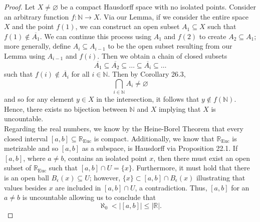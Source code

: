 \documentclass[ 12pt ]{article}
\begin{document}
\begin{enumerate}
		\begin{proof}
			Let $X \neq \varnothing$ be a compact Hausdorff space with no isolated points. Consider an arbitrary function $f : \mathbb{N} \to X$. Via our Lemma, if we consider
			the entire space $X$ and the point $f(1)$, we can construct an open subset $A_1 \subseteq X$ such that $f(1) \notin \overline{A_1}$. We can continue this process using $A_1$
			and $f(2)$ to create $A_2 \subseteq A_1$; more generally, define $A_i \subseteq A_{i-1}$ to be the open subset resulting from our Lemma using $A_{i-1}$ and $f(i)$. Then we
			obtain a chain of closed subsets $$\overline{A_1} \subseteq \overline{A_2} \subseteq \hdots \subseteq \overline{A_i} \subseteq \hdots$$ such that $f(i) \notin \overline{A_i}$
			for all $i \in \mathbb{N}$. Then by Corollary 26.3, $$\bigcap_{i \in \mathbb{N}} A_i \neq \varnothing$$ and so for any element $y \in X$ in the intersection, it follows that
			$y \notin f(\mathbb{N})$. Hence, there exists no bijection between $\mathbb{N}$ and $X$ implying that $X$ is uncountable. \\

			Regarding the real numbers, we know by the Heine-Borel Theorem that every closed interval $[a, b] \subseteq \mathbb{R}_\mathrm{Euc}$ is compact. Additionally, we know that
			$\mathbb{R}_\mathrm{Euc}$ is metrizable and so $[a, b]$ as a subspace, is Hausdorff via Proposition 22.1. If $[a, b]$, where $a \neq b$, contains an isolated point $x$, then
			there must exist an open subset of $\mathbb{R}_\mathrm{Euc}$ such that $[a, b] \cap U = \{ x \}$. Furthermore, it must hold that there is an open ball $B_\epsilon(x)
			\subseteq U$; however, $\{ x \} \subset [a, b] \cap B_\epsilon(x)$ illustrating that values besides $x$ are included in $[a, b] \cap U$, a contradiction. Thus, $[a, b]$ for
			an $a \neq b$ is uncountable allowing us to conclude that $$\aleph_0 < |[a, b]| \leq |\mathbb{R}|.$$
		\end{proof}


\end{enumerate}
\end{document}
